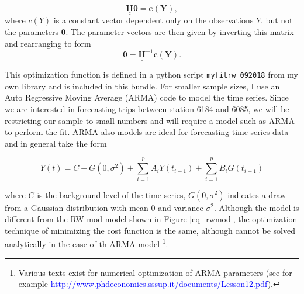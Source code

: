 \documentclass[10pt]{article}
\begin{document}
\begin{equation}
\label{eq_hes}
\underline{\underline{\mathbf{H}}} \mathbf{\theta} = \mathbf{c(Y)},
\end{equation}
\noindent where $c(Y)$ is a constant vector dependent only on the observations $Y$, but not the parameters $\mathbf{\theta}$. The parameter vectors are then given by inverting this matrix and rearranging to form 
\begin{equation}
\label{eq_hespars}
\mathbf{\theta} = \underline{\underline{\mathbf{H}}}^{-1} \mathbf{c(Y)}.
\end{equation}


This optimization function is defined in a python script \verb|myfitrw_092018| from my own library and is included in this bundle. For smaller sample sizes, I use an Auto Regressive Moving Average (ARMA) code to model the time series. Since we are interested in forecasting trips between station 6184 and 6085, we will be restricting our sample to small numbers and will require a model such as ARMA to perform the fit. ARMA also models are ideal for forecasting time series data and in general take the form

\begin{equation}
\label{eq_arma}
Y(t) = C + G(0,\sigma^2) + \sum_{i=1}^{p} A_i Y(t_{i-1}) + \sum_{i=1}^{p} B_i G(t_{i-1})
\end{equation}


\noindent where $C$ is the background level of the time series, $G(0,\sigma^2)$ indicates a draw from a Gaussian distribution with mean $0$ and variance $\sigma^2$. Although the model is different from the RW-mod model shown in Figure \ref{eq_rwmod}, the optimization technique of minimizing the cost function is the same, although cannot be solved analytically in the case of th ARMA model \footnote{Various texts exist for numerical optimization of ARMA  parameters (see for example \href{ http://www.phdeconomics.sssup.it/documents/Lesson12.pdf}{\textcolor{blue}{http://www.phdeconomics.sssup.it/documents/Lesson12.pdf}}).}.
\end{document}
